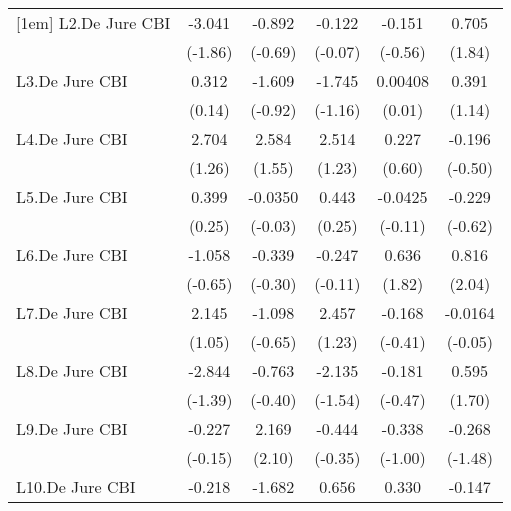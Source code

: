 {\begin{longtable}{l*{5}{c}}
[1em]
L2.De Jure CBI  &   -3.041         &   -0.892         &   -0.122         &   -0.151         &    0.705         \\
                &  (-1.86)         &  (-0.69)         &  (-0.07)         &  (-0.56)         &   (1.84)         \\
[1em]
L3.De Jure CBI  &    0.312         &   -1.609         &   -1.745         &  0.00408         &    0.391         \\
                &   (0.14)         &  (-0.92)         &  (-1.16)         &   (0.01)         &   (1.14)         \\
[1em]
L4.De Jure CBI  &    2.704         &    2.584         &    2.514         &    0.227         &   -0.196         \\
                &   (1.26)         &   (1.55)         &   (1.23)         &   (0.60)         &  (-0.50)         \\
[1em]
L5.De Jure CBI  &    0.399         &  -0.0350         &    0.443         &  -0.0425         &   -0.229         \\
                &   (0.25)         &  (-0.03)         &   (0.25)         &  (-0.11)         &  (-0.62)         \\
[1em]
L6.De Jure CBI  &   -1.058         &   -0.339         &   -0.247         &    0.636         &    0.816\sym{*}  \\
                &  (-0.65)         &  (-0.30)         &  (-0.11)         &   (1.82)         &   (2.04)         \\
[1em]
L7.De Jure CBI  &    2.145         &   -1.098         &    2.457         &   -0.168         &  -0.0164         \\
                &   (1.05)         &  (-0.65)         &   (1.23)         &  (-0.41)         &  (-0.05)         \\
[1em]
L8.De Jure CBI  &   -2.844         &   -0.763         &   -2.135         &   -0.181         &    0.595         \\
                &  (-1.39)         &  (-0.40)         &  (-1.54)         &  (-0.47)         &   (1.70)         \\
[1em]
L9.De Jure CBI  &   -0.227         &    2.169\sym{*}  &   -0.444         &   -0.338         &   -0.268         \\
                &  (-0.15)         &   (2.10)         &  (-0.35)         &  (-1.00)         &  (-1.48)         \\
[1em]
L10.De Jure CBI &   -0.218         &   -1.682\sym{**} &    0.656         &    0.330         &   -0.147         \\

\end{longtable}}
